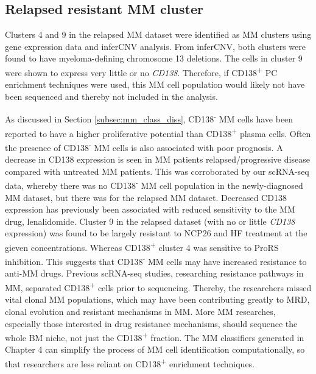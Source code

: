 \subsection{Relapsed resistant MM cluster}

Clusters 4 and 9 in the relapsed MM dataset were identified as MM clusters using gene expression data and inferCNV analysis.
From inferCNV, both clusters were found to have myeloma-defining chromosome 13 deletions.
The cells in cluster 9 were shown to express very little or no \textit{CD138}.
Therefore, if CD138\textsuperscript{+} PC enrichment techniques were used, this MM cell population would likely not have been sequenced and thereby not included in the analysis.

As discussed in Section \ref{subsec:mm_class_diss}, CD138\textsuperscript{-} MM cells have been reported to have a higher proliferative potential than CD138\textsuperscript{+} plasma cells.
Often the presence of CD138\textsuperscript{-} MM cells is also associated with poor prognosis.
A decrease in CD138 expression is seen in MM patients relapsed/progressive disease compared with untreated MM patients\cite{kawano2012multiple}.
This was corroborated by our scRNA-seq data, whereby there was no CD138\textsuperscript{-} MM cell population in the newly-diagnosed MM dataset, but there was for the relapsed MM dataset.
Decreased CD138 expression has previously been associated with reduced sensitivity to the MM drug, lenalidomide\cite{kawano2012multiple}.
Cluster 9 in the relapsed dataset (with no or little \textit{CD138} expression) was found to be largely resistant to NCP26 and HF treatment at the gieven concentrations.
Whereas CD138\textsuperscript{+} cluster 4 was sensitive to ProRS inhibition.
This suggests that CD138\textsuperscript{-} MM cells may have increased resistance to anti-MM drugs.
Previous scRNA-seq studies, researching resistance pathways in MM, separated CD138\textsuperscript{+} cells prior to sequencing\cite{cohen2021identification}.
Thereby, the researchers missed vital clonal MM populations, which may have been contributing greatly to MRD, clonal evolution and resistant mechanisms in MM\@.
More MM researches, especially those interested in drug resistance mechanisms, should sequence the whole BM niche, not just the CD138\textsuperscript{+} fraction.
The MM classifiers generated in Chapter 4 can simplify the process of MM cell identification computationally, so that researchers are less reliant on CD138\textsuperscript{+} enrichment techniques.

